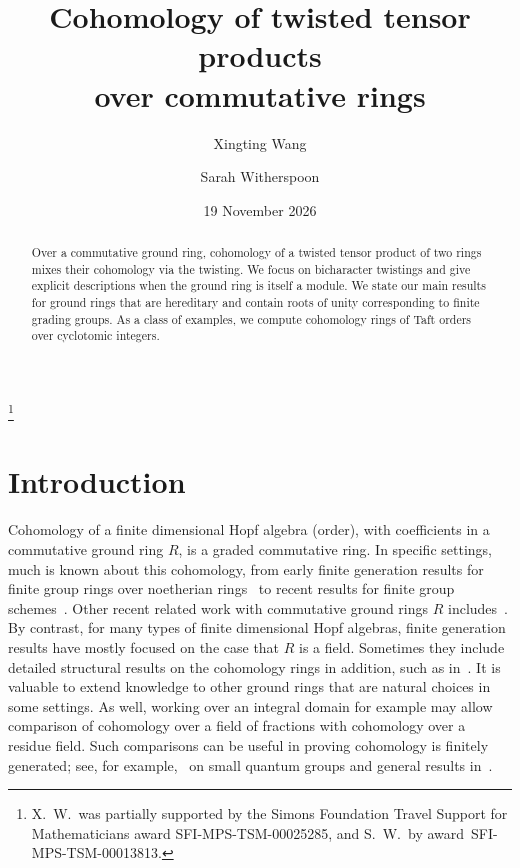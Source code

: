 \documentclass[11pt]{amsart}
\numberwithin{equation}{section}
\theoremstyle{definition}
\theoremstyle{remark}
\begin{document}
\thanks{X.~W.~was partially supported by the Simons Foundation Travel Support for
Mathematicians award SFI-MPS-TSM-00025285, and  
S.~W.~by award~SFI-MPS-TSM-00013813.}

\title[Cohomology of twisted tensor products]
{Cohomology of twisted tensor products\\ over commutative rings}

\author{Xingting Wang}
\address{Department of Mathematics\\Louisiana State University\\Baton Rouge, LA 70803}

\author{Sarah Witherspoon}
\address{Department of Mathematics\\Texas A\&M University\\College Station, TX 77843}

\date{19 November 2026}


\begin{abstract}
Over a commutative ground ring,
cohomology of a twisted tensor product of two rings
mixes their cohomology via the twisting.
We focus on bicharacter twistings and give explicit descriptions
when the ground ring is itself a module. 
We state our main results for 
ground rings that are hereditary and contain
roots of unity corresponding to finite grading groups.
As a class of examples, 
we compute cohomology rings of Taft orders over cyclotomic integers. 
\end{abstract}

\maketitle


\section{Introduction}

Cohomology of a finite dimensional Hopf algebra (order), with coefficients 
in a commutative ground ring $R$, is a graded commutative ring.
In specific settings, much is known about this cohomology, 
from early finite generation results for finite group rings
over noetherian rings~\cite{Evens} to recent
results for finite group schemes~\cite{GP,vdK}.
Other recent related work with commutative ground rings $R$
includes~\cite{Be,BL,Magland}.
By contrast, for many types of finite dimensional Hopf algebras,
finite generation results have mostly focused on the case that 
$R$ is a field.
Sometimes they include detailed structural results on the cohomology
rings in addition, such as in~\cite{BNPP14,GK93}.
It is valuable to extend knowledge to other ground rings
that are natural choices in some settings. 
As well, working over an integral domain
for example may allow comparison of
cohomology over a field of fractions
with cohomology over a residue field.
Such comparisons can be useful 
in proving cohomology is finitely generated; 
see, for example,~\cite{KV} on small quantum groups
and general results in~\cite{NWW}. 
\end{document}

